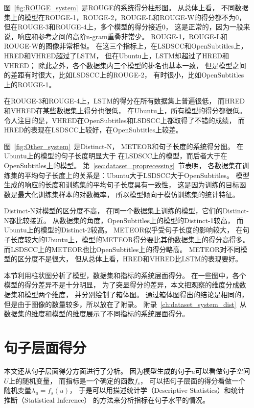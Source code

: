 
图~\ref{fig:ROUGE_system}~是ROUGE的系统得分柱形图。
从总体上看，
不同数据集上的模型在ROUGE-1，ROUGE-2，ROUGE-L和ROUGE-W的得分都不为0，
但在ROUGE-3和ROUGE-4上，多个模型的得分接近0，
这是正常的，因为一般来说，响应和参考之间的高阶n-gram重叠非常少。
ROUGE-1，ROUGE-L和ROUGE-W的图像非常相似。
在这三个指标上，在LSDSCC和OpenSubtitles上，HRED和VHRED超过了LSTM，
但在Ubuntu上，LSTM却超过了HRED和VHRED；
除此之外，各个数据集内三个模型的排名也基本一致，
但是模型之间的差距有时很大，比如LSDSCC上的ROUGE-2，
有时很小，比如OpenSubtitles上的ROUGE-1。

在ROUGE-3和ROUGE-4上，LSTM的得分在所有数据集上普遍很低，
而HRED和VHRED在某些数据集上得分也很低，
在Ubuntu上，所有模型的得分都很低。
令人注目的是，VHRED在OpenSubtitles和LSDSCC上都取得了不错的成绩，
而HRED的表现在LSDSCC上较好，在OpenSubtitles上较差。

图~\ref{fig:Other_system}~是Distinct-N，
METEOR和句子长度的系统得分图。
在Ubuntu上的模型的句子长度明显大于
在LSDSCC上的模型，而后者大于在OpenSubtitles上的模型。
第~\ref{sec:dataset_proprecessing}~节表明，
各数据集在训练集的平均句子长度上的关系是：Ubuntu大于LSDSCC大于OpenSubtitles。
模型生成的响应的长度和训练集的平均句子长度具有一致性，
这是因为训练的目标函数是最大化训练集样本的对数概率，
所以模型倾向于模仿训练集的统计特征。

Distinct-N对模型的区分度不高，
在同一个数据集上训练的模型，它们的Distinct-N都比较接近。
从数据集的角度，OpenSubtitles上的模型的Distinct-1较高，
而Ubuntu上的模型的Distinct-2较高。
METEOR似乎受句子长度的影响较大，
在句子长度较大的Ubuntu上，模型的METEOR得分要比其他数据集上的得分高得多。
而LSDSCC上的METEOR也比OpenSubtitles上的得分略高。
METEOR对不同模型的区分度不是很大，
但从总体上看，HRED和VHRED比LSTM的表现要好。


本节利用柱状图分析了模型，数据集和指标的系统层面得分。
在一些图中，各个模型的得分差异不是十分明显，
为了突显得分的差异，本文把观察的维度分成数据集和模型两个维度，
并分别绘制了箱体图。
通过箱体图得出的结论是相同的，但是由于图像的数量较多，所以放在了附录。
附录~\ref{ch:dataset_system_dist}~从
数据集的维度和模型的维度展示了不同指标的系统层面得分。

\section{句子层面得分}\label{sec:utterance_scores}
本文还从句子层面得分方面进行了分析。
因为模型生成的句子$u$可以看做句子空间$U$上的随机变量，
而指标是一个确定的函数$f_{s}$，
可以把句子层面的得分看做一个随机变量$\lambda_u = f_{s}(u)$，
于是可以用描述统计学（Descriptive Statistics）和统计推断（Statistical Inference）
的方法来分析指标在句子水平的情况。

